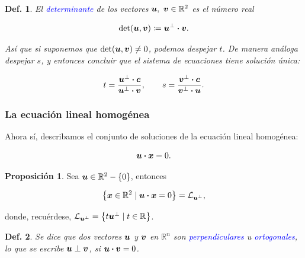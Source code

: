 \documentclass{article}
\theoremstyle{definicion}
\newtheorem{definicion}{Def.}
\theoremstyle{definition}             %
\theoremstyle{definition}             %
\theoremstyle{definition}
\theoremstyle{definition}
\theoremstyle{observacion}
\theoremstyle{definition}
\newtheorem{prop}{Proposición}
\theoremstyle{plain}
\theoremstyle{definition}
\theoremstyle{afirmacion}
\theoremstyle{notation}
\theoremstyle{definition}
\begin{document}
        \begin{definicion}
            El \textcolor{blue}{determinante} de los vectores \(\vb*{u},\ \vb*{v} \in \mathbb{R}^{2}\) es el número real

            \begin{equation*}
                \det(\vb*{u}, \vb*{v}) \coloneq \vb*{u}^{\perp} \vdot \vb*{v}. 
            \end{equation*}

            Así que si suponemos que \(\det(\vb*{u}, \vb*{v}) \neq 0\), podemos despejar \(t\). De manera análoga despejar \(s\), y entonces concluir que el sistema de ecuaciones tiene solución única:

            \begin{equation*}
                t = \dfrac{\vb*{u}^{\perp} \vdot \vb*{c}}{\vb*{u}^{\perp} \vdot \vb*{v}}, \qquad s = \dfrac{\vb*{v}^{\perp} \vdot \vb*{c}}{\vb*{v}^{\perp} \vdot \vb*{u}}.
            \end{equation*}
        \end{definicion}

        \subsubsection*{La ecuación lineal homogénea}

        Ahora sí, describamos el conjunto de soluciones de la ecuación lineal homogénea:

        \begin{equation*}
            \vb*{u} \vdot \vb*{x} = 0.
        \end{equation*}

        \begin{prop}
            Sea \(\vb*{u} \in \mathbb{R}^{2} - \{0\}\), entonces

            \begin{equation*}
                \left\lbrace \vb*{x} \in \mathbb{R}^{2} \mid \vb*{u} \vdot \vb*{x} = 0\right\rbrace = \mathcal{L}_{\vb*{u}^{\perp}},
            \end{equation*}

            donde, recuérdese, \(\mathcal{L}_{\vb*{u}^{\perp}} = \left\lbrace t\vb*{u}^{\perp} \mid t \in \mathbb{R}\right\rbrace\). 
        \end{prop}

        \begin{definicion}
            Se dice que dos vectores \(\vb*{u}\) y \(\vb*{v}\) en \(\mathbb{R}^{n}\) son \textcolor{blue}{perpendiculares} u \textcolor{blue}{ortogonales}, lo que se escribe \(\vb*{u} \perp \vb*{v}\), si \(\vb*{u} \vdot \vb*{v} = 0\).
        \end{definicion}
\end{document}
